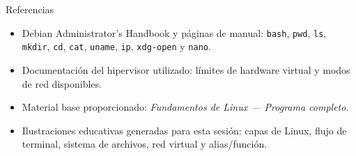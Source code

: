 \documentclass[aspectratio=169,10pt,c]{beamer}
\begin{document}
\begin{frame}{Referencias}
\scriptsize
\begin{itemize}\setlength\itemsep{4pt}
  \item Debian Administrator's Handbook y páginas de manual: \texttt{bash}, \texttt{pwd}, \texttt{ls}, \texttt{mkdir}, \texttt{cd}, \texttt{cat}, \texttt{uname}, \texttt{ip}, \texttt{xdg-open} y \texttt{nano}.
  \item Documentación del hipervisor utilizado: límites de hardware virtual y modos de red disponibles.
  \item Material base proporcionado: \emph{Fundamentos de Linux — Programa completo}.
  \item Ilustraciones educativas generadas para esta sesión: capas de Linux, flujo de terminal, sistema de archivos, red virtual y alias/función.
\end{itemize}
\end{frame}
\end{document}
